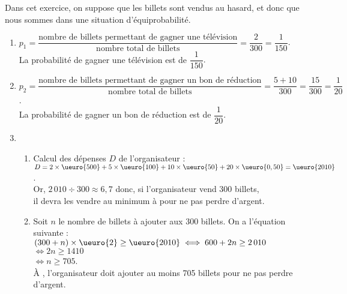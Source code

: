    Dans cet exercice, on suppose que les billets sont vendus au hasard, et donc que nous sommes dans une situation d'équiprobabilité. \\ [1mm]
   \begin{enumerate}
      \item $p_1 =\dfrac{\text{nombre de billets permettant de gagner une télévision}}{\text{nombre total de billets}} =\dfrac{2}{300} =\dfrac{1}{150}$. \\ [2mm]
         {\blue La probabilité de gagner une télévision est de $\dfrac{1}{150}$}. \\ [2mm]
      \item $p_2 =\dfrac{\text{nombre de billets permettant de gagner un bon de réduction}}{\text{nombre total de billets}} =\dfrac{5+10}{300} =\dfrac{15}{300} =\dfrac{1}{20}$. \\ [2mm]
         {\blue La probabilité de gagner un bon de réduction est de $\dfrac{1}{20}$}. \smallskip
   \item
      \begin{enumerate}
         \item Calcul des dépenses $D$ de l'organisateur : \\
            $D =2\times\ueuro{500}+5\times\ueuro{100}+10\times\ueuro{50} +20\times\ueuro{0,50} =\ueuro{2010}$. \\
            Or, $2\,010\div300 \approx6,7$ donc, si l'organisateur vend 300 billets, \\
            {\blue il devra les vendre au minimum à  pour ne pas perdre d'argent}. \\
         \item Soit $n$ le nombre de billets à ajouter aux 300 billets. On a l'équation suivante : \\
            $(300+n)\times\ueuro{2} \geq\ueuro{2010} \iff 600+2n\geq2\,010$ \\
            \hspace*{3.7cm} $\iff 2n \geq1410$ \\
            \hspace*{3.7cm} $\iff n\geq705$. \\
            {\blue À , l'organisateur doit ajouter au moins 705 billets pour ne pas perdre d'argent}.
      \end{enumerate}
   \end{enumerate}
